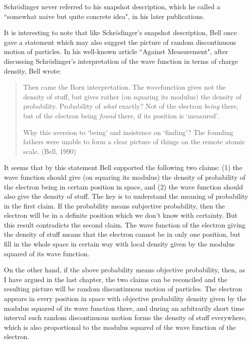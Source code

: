 Schr\"{o}dinger never referred to his snapshot description, which he called a ``somewhat naive but quite concrete idea", in his later publications.


It is interesting to note that like Schr\"{o}dinger's snapshot description, Bell once gave a statement which may also suggest the picture of random discontinuous motion of particles. In his well-known article ``Against Measurement", after discussing Schr\"{o}dinger's interpretation of the wave function in terms of charge density, Bell wrote:

\begin{quote}
Then came the Born interpretation. The wavefunction gives not the density of stuff, but gives rather (on squaring its modulus) the density of probability. Probability of \emph{what} exactly? Not of the electron  \emph{being} there, but of the electron being  \emph{found} there, if its position is `measured'. 

Why this aversion to `being' and insistence on `finding'? The founding fathers were unable to form a clear picture of things on the remote atomic scale. (Bell, 1990)
\end{quote}

It seems that by this statement Bell supported the following two claims: (1) the wave function should give (on squaring its modulus) the density of probability of  the electron being in certain position in space, and (2) the wave function should also give the density of stuff.
The key is to understand the meaning of probability in the first claim. 
If the probability means subjective probability, then the electron will be in a definite position which we don't know with certainty. But this result contradicts the second claim. The wave function of the electron giving the density of stuff means that the electron cannot be in only one position, but fill in the whole space in certain way with local density given by the modulus squared of its wave function.

On the other hand, if the above probability means objective probability, then, as I have argued in the last chapter, the two claims can be reconciled and the resulting picture will be random discontinuous motion of particles. The electron appears in every position in space with objective probability density given by the modulus squared of its wave function there, and during an arbitrarily short time interval such random discontinuous motion forms the density of stuff everywhere, which is also proportional to the modulus squared of the wave function of the electron.

